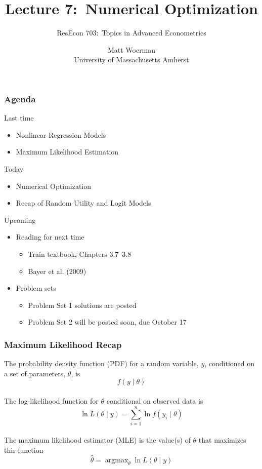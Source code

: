 \documentclass{beamer}\usepackage[]{graphicx}\usepackage[]{color}
\title[Lecture 7:\ Numerical Optimization]{Lecture 7:\ Numerical Optimization}
\author[ResEcon 703:\ Advanced Econometrics]{ResEcon 703:\ Topics in Advanced Econometrics}
\date{Matt Woerman\\University of Massachusetts Amherst}
\DeclareMathOperator*{\argmax}{argmax}
\begin{document}
{ 
\begin{frame}[noframenumbering]
    \titlepage
\end{frame}
}

\begin{frame}\frametitle{Agenda}
    Last time
    \begin{itemize}
    	\item Nonlinear Regression Models
        \item Maximum Likelihood Estimation
    \end{itemize}
    \vspace{2ex}
    Today
    \begin{itemize}
    	\item Numerical Optimization
    	\item Recap of Random Utility and Logit Models
    \end{itemize}
    \vspace{2ex}
    Upcoming
    \begin{itemize}
        \item Reading for next time
        \begin{itemize}
            \item Train textbook, Chapters 3.7--3.8
            \item Bayer et al. (2009)
        \end{itemize}
        \item Problem sets
        \begin{itemize}
            \item Problem Set 1 solutions are posted
            \item Problem Set 2 will be posted soon, due October 17
        \end{itemize}
    \end{itemize}
\end{frame}

\begin{frame}\frametitle{Maximum Likelihood Recap}
    The probability density function (PDF) for a random variable, $y$, conditioned on a set of parameters, $\theta$, is
    $$f(y \mid \theta)$$ \\
    The log-likelihood function for $\theta$ conditional on observed data is
    $$\ln L(\theta \mid y) = \sum_{i = 1}^n \ln f(y_i \mid \theta)$$ \\
    The maximum likelihood estimator (MLE) is the value(s) of $\theta$ that maximizes this function
    $$\hat{\theta} = \argmax_\theta \ln L(\theta \mid y)$$
\end{frame}
\end{document}
